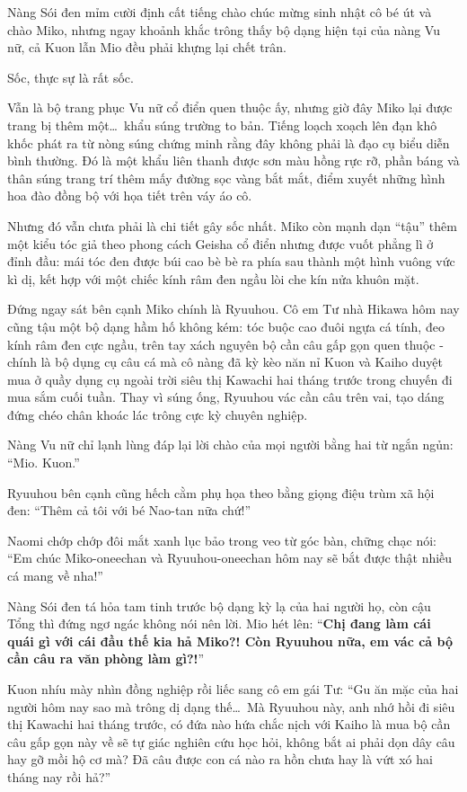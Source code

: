 \documentclass[../main.tex]{subfiles}
\begin{document}
Nàng Sói đen mỉm cười định cất tiếng chào chúc mừng sinh nhật cô bé út và chào Miko, nhưng ngay khoảnh khắc trông thấy bộ dạng hiện tại của nàng Vu nữ, cả Kuon lẫn Mio đều phải khựng lại chết trân.

Sốc, thực sự là rất sốc.

Vẫn là bộ trang phục Vu nữ cổ điển quen thuộc ấy, nhưng giờ đây Miko lại được trang bị thêm một\dots\ khẩu súng trường to bản. Tiếng loạch xoạch lên đạn khô khốc phát ra từ nòng súng chứng minh rằng đây không phải là đạo cụ biểu diễn bình thường. Đó là một khẩu liên thanh được sơn màu hồng rực rỡ, phần báng và thân súng trang trí thêm mấy đường sọc vàng bắt mắt, điểm xuyết những hình hoa đào đồng bộ với họa tiết trên váy áo cô.

Nhưng đó vẫn chưa phải là chi tiết gây sốc nhất. Miko còn mạnh dạn ``tậu'' thêm một kiểu tóc giả theo phong cách Geisha cổ điển nhưng được vuốt phẳng lì ở đỉnh đầu: mái tóc đen được búi cao bè bè ra phía sau thành một hình vuông vức kì dị, kết hợp với một chiếc kính râm đen ngầu lòi che kín nửa khuôn mặt.


Đứng ngay sát bên cạnh Miko chính là Ryuuhou. Cô em Tư nhà Hikawa hôm nay cũng tậu một bộ dạng hầm hố không kém: tóc buộc cao đuôi ngựa cá tính, đeo kính râm đen cực ngầu, trên tay xách nguyên bộ cần câu gấp gọn quen thuộc - chính là bộ dụng cụ câu cá mà cô nàng đã kỳ kèo năn nỉ Kuon và Kaiho duyệt mua ở quầy dụng cụ ngoài trời siêu thị Kawachi hai tháng trước trong chuyến đi mua sắm cuối tuần. Thay vì súng ống, Ryuuhou vác cần câu trên vai, tạo dáng đứng chéo chân khoác lác trông cực kỳ chuyên nghiệp.

Nàng Vu nữ chỉ lạnh lùng đáp lại lời chào của mọi người bằng hai từ ngắn ngủn: ``Mio. Kuon.''

Ryuuhou bên cạnh cũng hếch cằm phụ họa theo bằng giọng điệu trùm xã hội đen: ``Thêm cả tôi với bé Nao-tan nữa chứ!''

Naomi chớp chớp đôi mắt xanh lục bảo trong veo từ góc bàn, chững chạc nói: ``Em chúc Miko-oneechan và Ryuuhou-oneechan hôm nay sẽ bắt được thật nhiều cá mang về nha!''

Nàng Sói đen tá hỏa tam tinh trước bộ dạng kỳ lạ của hai người họ, còn cậu Tổng thì đứng ngơ ngác không nói nên lời. Mio hét lên: ``\textbf{Chị đang làm cái quái gì với cái đầu thế kia hả Miko?! Còn Ryuuhou nữa, em vác cả bộ cần câu ra văn phòng làm gì?!}''

Kuon nhíu mày nhìn đồng nghiệp rồi liếc sang cô em gái Tư: ``Gu ăn mặc của hai người hôm nay sao mà trông dị dạng thế\dots\ Mà Ryuuhou này, anh nhớ hồi đi siêu thị Kawachi hai tháng trước, có đứa nào hứa chắc nịch với Kaiho là mua bộ cần câu gấp gọn này về sẽ tự giác nghiên cứu học hỏi, không bắt ai phải dọn dây câu hay gỡ mồi hộ cơ mà? Đã câu được con cá nào ra hồn chưa hay là vứt xó hai tháng nay rồi hả?''
\end{document}
